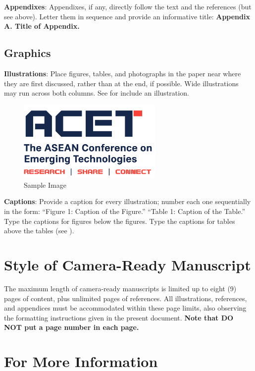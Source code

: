 \documentclass[11pt,a4paper]{article}
\begin{document}
{\bf Appendixes}: Appendixes, if any, directly follow the text and the
references (but see above).  Letter them in sequence and provide an
informative title: {\bf Appendix A. Title of Appendix.}

\subsection{Graphics}

{\bf Illustrations}: Place figures, tables, and photographs in the paper
near where they are first discussed, rather than at the end, if
possible.  Wide illustrations may run across both columns.  See
 for include an illustration.

\begin{figure}[ht]
\begin{center}
\includegraphics[width=7cm]{./fig/ACET_logo.png}
\caption{Sample Image} \label{sampleimg}
\end{center}
\end{figure} 

{\bf Captions}: Provide a caption for every illustration; number each
one sequentially in the form: ``Figure 1:  Caption of the Figure.''
``Table 1:  Caption of the Table.''  Type the captions for figures below
the figures.  Type the captions for tables above the tables (see
).


\section{Style of Camera-Ready Manuscript}

The maximum length of camera-ready manuscripts is limited up to eight (9) pages of content, plus unlimited pages of references. All illustrations, references, and appendices must be accommodated within these page limits, also observing the formatting instructions given in the present document.  {\bf Note that DO NOT put a page number in each page.}

\section{For More Information}
\end{document}
